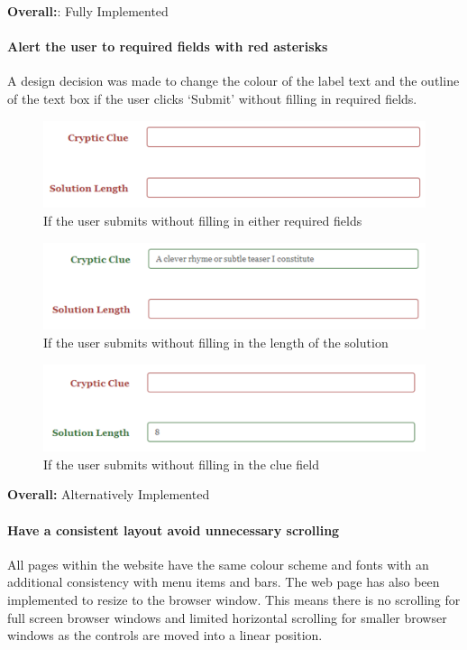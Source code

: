 {\bf Overall:}: Fully Implemented

\paragraph{Alert the user to required fields with red asterisks}
   A design decision was made to change the colour of the label text 
and the outline of the text box if the user clicks `Submit' without filling in
 required fields.

\begin{figure}[H]
	\centering
	\includegraphics[keepaspectratio=true]{evidence/alert1.png}
	\caption{If the user submits without filling in either required fields}
\end{figure}

\begin{figure}[H]
	\centering
	\includegraphics[keepaspectratio=true]{evidence/alert2.png}
	\caption{If the user submits without filling in the length of the solution}
\end{figure}

\begin{figure}[H]
	\centering
	\includegraphics[keepaspectratio=true]{evidence/alert3.png}
	\caption{If the user submits without filling in the clue field}
\end{figure}

{\bf Overall:} Alternatively Implemented

\paragraph{Have a consistent layout avoid unnecessary scrolling}
    All pages within the website have the same colour scheme and fonts 
with an additional consistency with menu items and bars. The web page 
has also been implemented to resize to the browser window. This means 
there is no scrolling for full screen browser windows and limited horizontal 
scrolling for smaller browser windows as the controls are moved into a linear 
position. 

